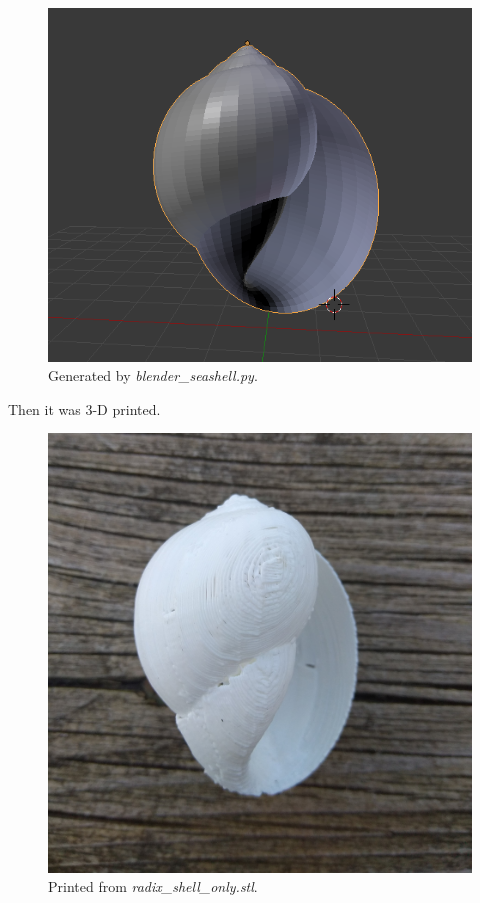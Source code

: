 \documentclass[a4paper]{article}
\begin{document}
\begin{figure}[h]
	\centering\includegraphics[scale=1.25]{./img/hexaplex_shell.png}
	\caption{Generated by \textit{blender\_seashell.py}.}
	\label{activator-inhibitor} %
\end{figure}

\pagebreak 

Then it was 3-D printed.

\begin{figure}[h]
	\centering\includegraphics[scale=0.05]{./img/hexaplex_printed.jpg}
	\caption{Printed from \textit{radix\_shell\_only.stl}.}
	\label{activator-inhibitor} %
\end{figure}
\end{document}
